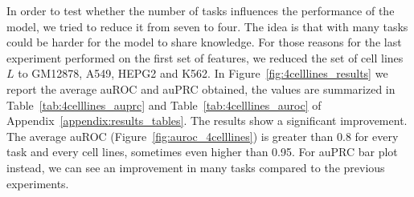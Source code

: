 
In order to test whether the number of tasks influences the performance of the model, we tried to reduce it from seven to four. The idea is that with many tasks could be harder for the model to share knowledge. For those reasons for the last experiment performed on the first set of features, we reduced the set of cell lines $L$ to GM12878, A549, HEPG2 and K562. In Figure~\ref{fig:4celllines_results} we report the average auROC and auPRC obtained, the values are summarized in Table~\ref{tab:4celllines_auprc} and Table~\ref{tab:4celllines_auroc} of Appendix~\ref{appendix:results_tables}. The results show a significant improvement. The average auROC (Figure~\ref{fig:auroc_4celllines}) is greater than 0.8 for every task and every cell lines, sometimes even higher than 0.95. For auPRC bar plot instead, we can see an improvement in many tasks compared to the previous experiments.
